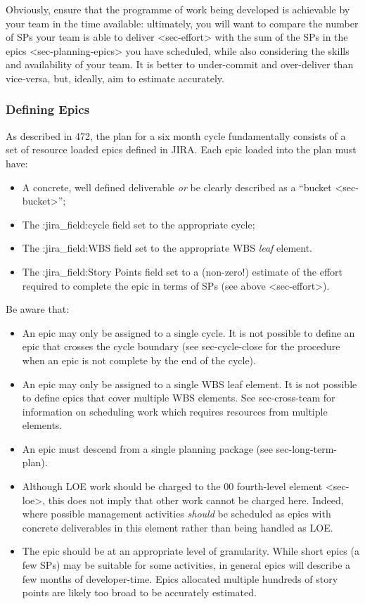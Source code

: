 Obviously, ensure that the programme of work being developed is
achievable by your team in the time available: ultimately, you will want
to compare the
number of SPs your team is able to deliver \textless{}sec-effort\textgreater{}
with the sum of the SPs in the
epics \textless{}sec-planning-epics\textgreater{} you have scheduled,
while also considering the skills and availability of your team. It is
better to under-commit and over-deliver than vice-versa, but, ideally,
aim to estimate accurately.

\subsubsection{Defining Epics}\label{defining-epics}

As described in 472, the plan for a six month cycle fundamentally
consists of a set of resource loaded epics defined in JIRA. Each epic
loaded into the plan must have:

\begin{itemize}
\item
  A concrete, well defined deliverable \emph{or} be clearly described as
  a ``bucket \textless{}sec-bucket\textgreater{}'';
\item
  The :jira\_field:cycle field set to the appropriate cycle;
\item
  The :jira\_field:WBS field set to the appropriate WBS \emph{leaf}
  element.
\item
  The :jira\_field:Story Points field set to a (non-zero!) estimate of
  the effort required to complete the epic in terms of SPs (see
  above \textless{}sec-effort\textgreater{}).
\end{itemize}

Be aware that:

\begin{itemize}
\item
  An epic may only be assigned to a single cycle. It is not possible to
  define an epic that crosses the cycle boundary (see sec-cycle-close
  for the procedure when an epic is not complete by the end of the
  cycle).
\item
  An epic may only be assigned to a single WBS leaf element. It is not
  possible to define epics that cover multiple WBS elements. See
  sec-cross-team for information on scheduling work which requires
  resources from multiple elements.
\item
  An epic must descend from a single planning package (see
  sec-long-term-plan).
\item
  Although LOE work should be charged to the 00 fourth-level element
  \textless{}sec-loe\textgreater{}, this does not imply that other work
  cannot be charged here. Indeed, where possible management activities
  \emph{should} be scheduled as epics with concrete deliverables in this
  element rather than being handled as LOE.
\item
  The epic should be at an appropriate level of granularity. While short
  epics (a few SPs) may be suitable for some activities, in general
  epics will describe a few months of developer-time. Epics allocated
  multiple hundreds of story points are likely too broad to be
  accurately estimated.
\end{itemize}

